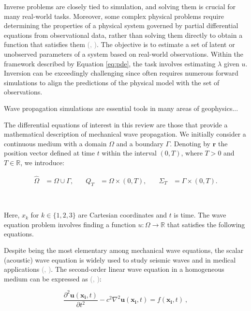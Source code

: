 \documentclass{tufte-handout}
\renewcommand{\citep}[2][]{\textcolor{gray}{(\citeauthor{#2}, \citeyear[#1]{#2})}}
\begin{document}
Inverse problems are closely tied to simulation, and solving them is crucial for many real-world tasks. Moreover, some complex physical problems require determining the properties of a physical system governed by partial differential equations from observational data, rather than solving them directly to obtain a function that satisfies them \citep{galiounas_battery_2022, ren_seismicnet_2024,mccann_convolutional_2017}. The objective is to estimate a set of latent or unobserved parameters of a system based on real-world observations. Within the framework described by Equation \ref{eq:pde}, the task involves estimating $\lambda$ given $u$. Inversion can be exceedingly challenging since often requires numerous forward simulations to align the predictions of the physical model with the set of observations. 


Wave propagation simulations are essential tools in many areas of geophysics...


The differential equations of interest in this review are those that provide a mathematical description of mechanical wave propagation. We initially consider a continuous medium with a domain $\Omega$ and a boundary $\Gamma$. Denoting by $\mathbf{r}$ the position vector defined at time $t$ within the interval $(0, T)$, where $T > 0$ and $T \in \mathbb{R}$, we introduce:

\[
\begin{aligned}
\hat{\Omega} &= \Omega \cup \Gamma, &\quad
Q_T &= \Omega \times (0,T), &\quad
\Sigma_T &= \Gamma \times (0,T).
\end{aligned}
\]

\

Here, $x_k$ for $k \in \{1, 2, 3\}$ are Cartesian coordinates and $t$ is time. The wave equation problem involves finding a function \( u : \Omega \to \mathbb{R} \) that satisfies the following equations.

Despite being the most elementary among mechanical wave equations, the scalar (acoustic) wave equation is widely used to study seismic waves and in medical applications \citep{moseley_physics-informed_2022, alkhadhr_wave_2023}. The second-order linear wave equation in a homogeneous medium can be expressed as \citep{Carcione2002}:

\begin{equation}
\frac{\partial^2 \boldsymbol{u}(\boldsymbol{x_i}, t)}{\partial t^2} - c^{2} \nabla^2 \boldsymbol{u}(\boldsymbol{x_i}, t) = f(\boldsymbol{x_i}, t) \ ,
\label{acoustic}
\end{equation}
\end{document}
